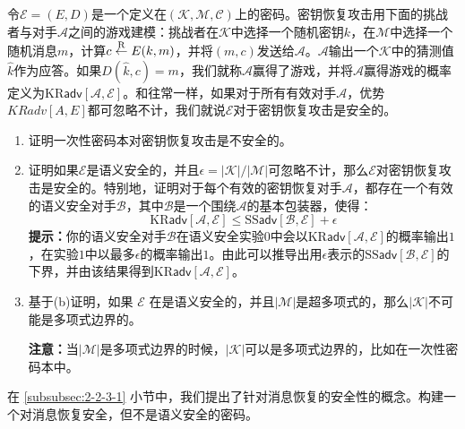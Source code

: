 \begin{exercise}[密钥恢复攻击]\label{exer:2-11}
令$\mathcal{E}=(E,D)$是一个定义在$(\mathcal{K},\mathcal{M},\mathcal{C})$上的密码。密钥恢复攻击用下面的挑战者与对手$\mathcal{A}$之间的游戏建模：挑战者在$\mathcal{K}$中选择一个随机密钥$k$，在$\mathcal{M}$中选择一个随机消息$m$，计算$c\overset{\rm R}\leftarrow E(k,m)$，并将$(m,c)$发送给$\mathcal{A}$。$\mathcal{A}$输出一个$\mathcal{K}$中的猜测值$\hat k$作为应答。如果$D(\hat{k},c)=m$，我们就称$\mathcal{A}$赢得了游戏，并将$\mathcal{A}$赢得游戏的概率定义为$\mathrm{KR}\mathsf{adv}[\mathcal{A},\mathcal{E}]$。和往常一样，如果对于所有有效对手$\mathcal{A}$，优势$KRadv[A,E]$都可忽略不计，我们就说$\mathcal{E}$对于密钥恢复攻击是安全的。
\begin{enumerate}[\indent(a)]
	\item 证明一次性密码本对密钥恢复攻击是不安全的。
	\item 证明如果$\mathcal{E}$是语义安全的，并且$\epsilon=|\mathcal{K}|/|\mathcal{M}|$可忽略不计，那么$\mathcal{E}$对密钥恢复攻击是安全的。特别地，证明对于每个有效的密钥恢复对手$\mathcal{A}$，都存在一个有效的语义安全对手$\mathcal{B}$，其中$\mathcal{B}$是一个围绕$\mathcal{A}$的基本包装器，使得：
	\[
	\mathrm{KR}\mathsf{adv}[\mathcal{A},\mathcal{E}]\leq\mathrm{SS}\mathsf{adv}[\mathcal{B},\mathcal{E}]+\epsilon
	\]
	\textbf{提示：}你的语义安全对手$\mathcal{B}$在语义安全实验$0$中会以$\mathrm{KR}\mathsf{adv}[\mathcal{A},\mathcal{E}]$的概率输出$1$，在实验$1$中以最多$\epsilon$的概率输出$1$。由此可以推导出用$\epsilon$表示的$\mathrm{SS}\mathsf{adv}[\mathcal{B},\mathcal{E}]$的下界，并由该结果得到$\mathrm{KR}\mathsf{adv}[\mathcal{A},\mathcal{E}]$。
	\item 基于(b)证明，如果 $\mathcal{E}$ 在是语义安全的，并且$|\mathcal{M}|$是超多项式的，那么$|\mathcal{K}|$不可能是多项式边界的。

	\vspace{1pt}

	\textbf{注意：}当$|\mathcal{M}|$是多项式边界的时候，$|\mathcal{K}|$可以是多项式边界的，比如在一次性密码本中。
\end{enumerate}
\end{exercise}

\begin{exercise}[对消息恢复的安全性]\label{exer:2-12}
在 \ref{subsubsec:2-2-3-1} 小节中，我们提出了针对消息恢复的安全性的概念。构建一个对消息恢复安全，但不是语义安全的密码。
\end{exercise}

